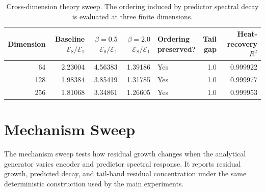 \documentclass{article}
\begin{document}
\begin{table}[H]
\centering
\caption{Cross-dimension theory sweep. The ordering induced by predictor spectral decay is evaluated at three finite dimensions.}
\label{tab:supp-dimension}
\setlength{\tabcolsep}{2.5pt}
\begin{tabular*}{\linewidth}{@{\extracolsep{\fill}}rrrrlrr@{}}
\toprule
Dimension & \shortstack{Baseline\\$\mathcal E_8/\mathcal E_1$} & \shortstack{$\beta=0.5$\\$\mathcal E_8/\mathcal E_1$} & \shortstack{$\beta=2.0$\\$\mathcal E_8/\mathcal E_1$} & \shortstack{Ordering\\preserved?} & \shortstack{Tail\\gap} & \shortstack{Heat-recovery\\$R^2$} \\
\midrule
64 & 2.23004 & 4.56383 & 1.39186 & Yes & 1.0 & 0.999922 \\
128 & 1.98384 & 3.85419 & 1.31785 & Yes & 1.0 & 0.999977 \\
256 & 1.81068 & 3.34861 & 1.26605 & Yes & 1.0 & 0.999953 \\
\bottomrule
\end{tabular*}
\end{table}

\section{Mechanism Sweep}
\label{sec:supp-mechanism}

The mechanism sweep tests how residual growth changes when the analytical generator varies encoder and predictor spectral response. It reports residual growth, predicted decay, and tail-band residual concentration under the same deterministic construction used by the main experiments.
\end{document}

